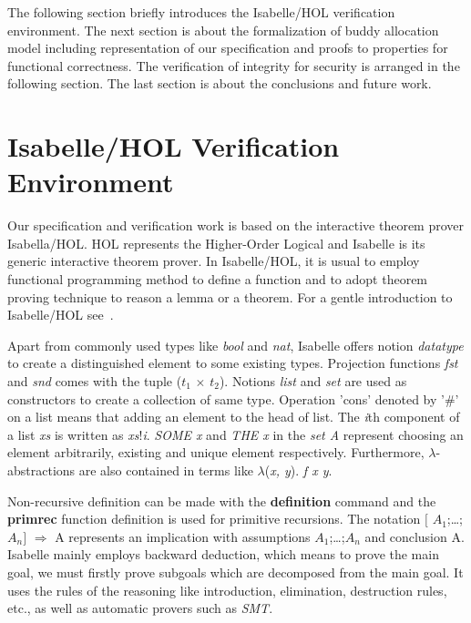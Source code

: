 \documentclass[runningheads]{llncs}
\begin{document}
The following section briefly introduces the Isabelle/HOL verification environment. The next section is about the formalization of buddy allocation model including representation of our specification and proofs to properties for functional correctness. The verification of integrity for security is arranged in the following section. The last section is about the conclusions and future work.


\section{Isabelle/HOL Verification Environment}
Our specification and verification work is based on the interactive theorem prover Isabella/HOL. HOL represents the Higher-Order Logical and Isabelle is its generic interactive theorem prover. In Isabelle/HOL, it is usual to employ functional programming method to define a function and to adopt theorem proving technique to reason a lemma or a theorem. For a gentle introduction to Isabelle/HOL see~\cite{reg_Isabelle/HOL}. 

Apart from commonly used types like \textsl{bool} and \textsl{nat}, Isabelle offers notion \textsl{datatype} to create a distinguished element to some existing types. Projection functions \textsl{fst} and \textsl{snd} comes with the tuple (\textsl{$t_1$} $\times$ \textsl{$t_2$}). Notions \textsl{list} and \textsl{set} are used as constructors to create a collection of same type. Operation 'cons' denoted by '$\#$' on a list means that adding an element to the head of list. The \textsl{i}th component of a list \textsl{xs} is written as \textsl{xs}!\textsl{i}. \textsl{SOME x} and \textsl{THE x} in the \textsl{set A} represent choosing an element arbitrarily, existing and unique element respectively. Furthermore, $\lambda$-abstractions are also contained in terms like $\lambda$(\textsl{x, y}). \textsl{f x y}.

Non-recursive definition can be made with the \textbf{definition} command and the \textbf{primrec} function definition is used for primitive recursions. The notation $\lbrack$ $A_1$;\dots;$A_n$$\rbrack$ $\Longrightarrow$ A represents an implication with assumptions $A_1$;\dots;$A_n$ and conclusion A. Isabelle mainly employs backward deduction, which means to prove the main goal, we must firstly prove subgoals which are decomposed from the main goal. It uses the rules of the reasoning like introduction, elimination, destruction rules, etc., as well as automatic provers such as \textsl{SMT}.
\end{document}
